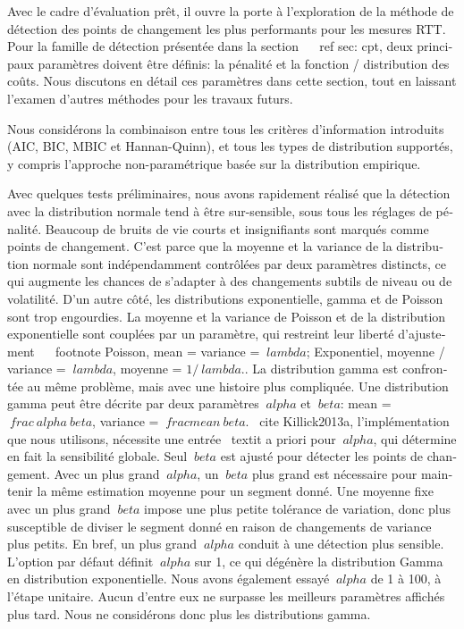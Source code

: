 \begin{otherlanguage}{french}
Avec le cadre d'évaluation prêt, il ouvre la porte à l'exploration de la méthode de détection des points de changement les plus performants pour les mesures RTT.
Pour la famille de détection présentée dans la section ~ \ ref {sec: cpt}, deux principaux paramètres doivent être définis: la pénalité et la fonction / distribution des coûts.
Nous discutons en détail ces paramètres dans cette section, tout en laissant l'examen d'autres méthodes pour les travaux futurs.

Nous considérons la combinaison entre tous les critères d'information introduits (AIC, BIC, MBIC et Hannan-Quinn), et tous les types de distribution supportés, y compris l'approche non-paramétrique basée sur la distribution empirique.

Avec quelques tests préliminaires, nous avons rapidement réalisé que la détection avec la distribution normale tend à être sur-sensible, sous tous les réglages de pénalité.
Beaucoup de bruits de vie courts et insignifiants sont marqués comme points de changement.
C'est parce que la moyenne et la variance de la distribution normale sont indépendamment contrôlées par deux paramètres distincts, ce qui augmente les chances de s'adapter à des changements subtils de niveau ou de volatilité.
D'un autre côté, les distributions exponentielle, gamma et de Poisson sont trop engourdies.
La moyenne et la variance de Poisson et de la distribution exponentielle sont couplées par un paramètre,
qui restreint leur liberté d'ajustement ~ \ footnote {Poisson, mean = variance = $ \ lambda $; Exponentiel, moyenne / variance = $ \ lambda $, moyenne = $ 1 / \ lambda $.}.
La distribution gamma est confrontée au même problème, mais avec une histoire plus compliquée.
Une distribution gamma peut être décrite par deux paramètres $ \ alpha $ et $ \ beta $: mean = $ \ frac {\ alpha} {\ beta} $, variance = $ \ frac {mean} {\ beta} $.
\ cite {Killick2013a}, l'implémentation que nous utilisons, nécessite une entrée \ textit {a priori} pour $ \ alpha $, qui détermine en fait la sensibilité globale.
Seul $ \ beta $ est ajusté pour détecter les points de changement.
Avec un plus grand $ \ alpha $, un $ \ beta $ plus grand est nécessaire pour maintenir la même estimation moyenne pour un segment donné.
Une moyenne fixe avec un plus grand $ \ beta $ impose une plus petite tolérance de variation, donc plus susceptible de diviser le segment donné en raison de changements de variance plus petits.
En bref, un plus grand $ \ alpha $ conduit à une détection plus sensible.
L'option par défaut définit $ \ alpha $ sur 1, ce qui dégénère la distribution Gamma en distribution exponentielle.
Nous avons également essayé $ \ alpha $ de 1 à 100, à l'étape unitaire.
Aucun d'entre eux ne surpasse les meilleurs paramètres affichés plus tard.
Nous ne considérons donc plus les distributions gamma.


\end{otherlanguage}

